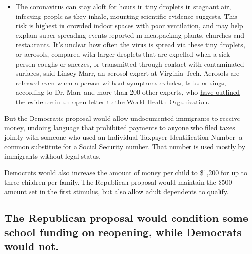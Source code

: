 \begin{itemize}
  \begin{itemize}
  \tightlist
  \item
    The coronavirus
    \href{https://www.nytimes.com/2020/07/04/health/239-experts-with-one-big-claim-the-coronavirus-is-airborne.html?action=click\&pgtype=Article\&state=default\&region=MAIN_CONTENT_3\&context=storylines_faq}{can
    stay aloft for hours in tiny droplets in stagnant air}, infecting
    people as they inhale, mounting scientific evidence suggests. This
    risk is highest in crowded indoor spaces with poor ventilation, and
    may help explain super-spreading events reported in meatpacking
    plants, churches and restaurants.
    \href{https://www.nytimes.com/2020/07/06/health/coronavirus-airborne-aerosols.html?action=click\&pgtype=Article\&state=default\&region=MAIN_CONTENT_3\&context=storylines_faq}{It's
    unclear how often the virus is spread} via these tiny droplets, or
    aerosols, compared with larger droplets that are expelled when a
    sick person coughs or sneezes, or transmitted through contact with
    contaminated surfaces, said Linsey Marr, an aerosol expert at
    Virginia Tech. Aerosols are released even when a person without
    symptoms exhales, talks or sings, according to Dr. Marr and more
    than 200 other experts, who
    \href{https://academic.oup.com/cid/article/doi/10.1093/cid/ciaa939/5867798}{have
    outlined the evidence in an open letter to the World Health
    Organization}.
  \end{itemize}
\end{itemize}

But the Democratic proposal would allow undocumented immigrants to
receive money, undoing language that prohibited payments to anyone who
filed taxes jointly with someone who used an Individual Taxpayer
Identification Number, a common substitute for a Social Security number.
That number is used mostly by immigrants without legal status.

Democrats would also increase the amount of money per child to \$1,200
for up to three children per family. The Republican proposal would
maintain the \$500 amount set in the first stimulus, but also allow
adult dependents to qualify.

\hypertarget{the-republican-proposal-would-condition-some-school-funding-on-reopening-while-democrats-would-not}{%
\subsection{The Republican proposal would condition some school funding
on reopening, while Democrats would
not.}\label{the-republican-proposal-would-condition-some-school-funding-on-reopening-while-democrats-would-not}}

